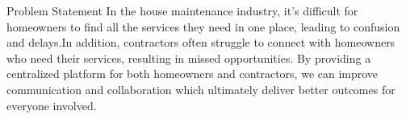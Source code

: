 \documentclass{beamer} %
\begin{document}
%       

\begin{frame}{Problem Statement}
    In the house maintenance industry, it's difficult for homeowners to find all the services they need in one place, leading to confusion and delays.In addition, contractors often struggle to connect with homeowners who need their services, resulting in missed opportunities. By providing a centralized platform for both homeowners and contractors, we can improve communication and collaboration which ultimately deliver better outcomes for everyone involved.
    
    
    \vspace{9pt} %
    \begin{figure}
        \hfill
    \end{figure}
    
\end{frame}

%       
  
\end{document}
